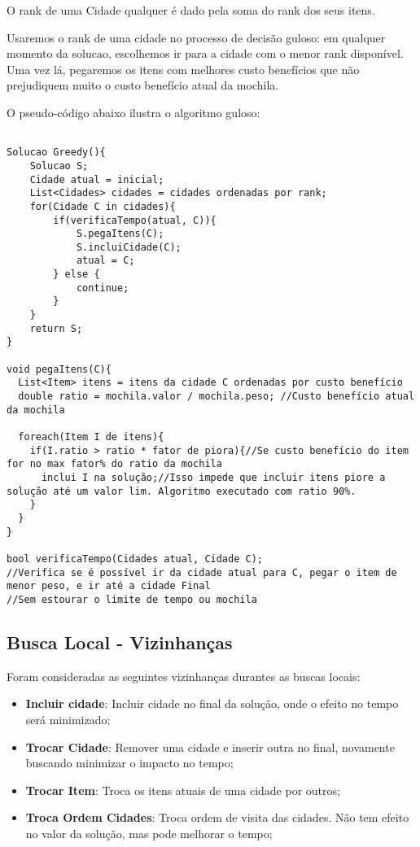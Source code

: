 \documentclass[12pt,14paper,onecolumn]{article}
\begin{document}
O rank de uma Cidade qualquer é dado pela soma do rank dos seus itens.

Usaremos o rank de uma cidade no processo de decisão guloso: em qualquer momento da solucao, escolhemos ir para a cidade com o menor rank disponível. Uma vez lá, pegaremos os itens com melhores custo benefícios que não prejudiquem muito o custo benefício atual da mochila.

O pseudo-código abaixo ilustra o algoritmo guloso:

\begin{lstlisting}

Solucao Greedy(){
	Solucao S;
	Cidade atual = inicial;
	List<Cidades> cidades = cidades ordenadas por rank;
	for(Cidade C in cidades){
		if(verificaTempo(atual, C)){
			S.pegaItens(C);
			S.incluiCidade(C);
			atual = C;
		} else {
			continue;
		}
	}
	return S;
}

void pegaItens(C){
  List<Item> itens = itens da cidade C ordenadas por custo benefício
  double ratio = mochila.valor / mochila.peso; //Custo benefício atual da mochila

  foreach(Item I de itens){
    if(I.ratio > ratio * fator de piora){//Se custo benefício do item for no max fator% do ratio da mochila
      inclui I na solução;//Isso impede que incluir itens piore a solução até um valor lim. Algoritmo executado com ratio 90%.
    }
  }
}

bool verificaTempo(Cidades atual, Cidade C);
//Verifica se é possível ir da cidade atual para C, pegar o item de menor peso, e ir até a cidade Final
//Sem estourar o limite de tempo ou mochila

\end{lstlisting}

\subsection{Busca Local - Vizinhanças}
Foram consideradas as seguintes vizinhanças durantes as buscas locais:

\begin{itemize}
\item \textbf{Incluir cidade}: Incluir cidade no final da solução, onde o efeito no tempo será minimizado;
			
\item \textbf{Trocar Cidade}: Remover uma cidade e inserir outra no final, novamente buscando minimizar o impacto no tempo;
		
\item \textbf{Trocar Item}: Troca os itens atuais de uma cidade por outros;
		
\item \textbf{Troca Ordem Cidades}: Troca ordem de visita das cidades. Não tem efeito no valor da solução, mas pode melhorar o tempo;

\end{itemize}
\end{document}
